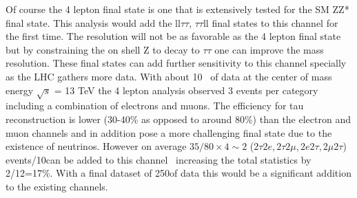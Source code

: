 Of course the 4 lepton final state is one that is extensively tested for the SM ZZ* final state. This analysis would add the ll$\tau\tau$, $\tau\tau$ll final states to this channel for the first time.  The resolution will not be as favorable as
the 4 lepton final state but by constraining the on shell Z to decay to $\tau \tau$ one can improve the mass resolution.  These final states can add further sensitivity to this channel specially as the LHC
gathers more data.  With about 10 \invfb\ of data at the center of mass energy $\sqrt s$ = 13 TeV the 4 lepton analysis observed 3 events per category including a combination of electrons and muons.  The efficiency for tau reconstruction is lower (30-40\% as opposed to around 80\%) than the electron and muon channels and in 
addition pose a more challenging final state due to the existence of neutrinos.
However on average $35/80\times4\sim 2$ ($2\tau2e, 2\tau2\mu, 2e2\tau,2\mu2\tau$) events/10\invfb can be added to this channel~\cite{2016:4l} increasing the total statistics by 2/12=17\%. With a final dataset of 250\invfb of data this would be a significant addition to the existing channels.





